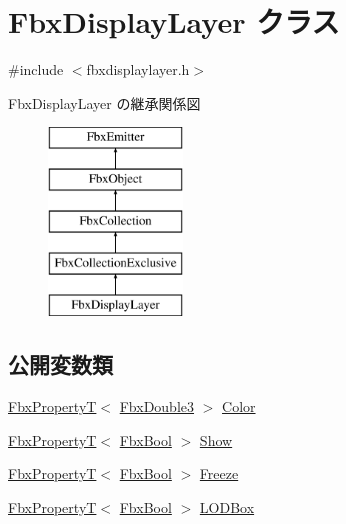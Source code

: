 \hypertarget{class_fbx_display_layer}{}\section{Fbx\+Display\+Layer クラス}
\label{class_fbx_display_layer}


{\ttfamily \#include $<$fbxdisplaylayer.\+h$>$}

Fbx\+Display\+Layer の継承関係図\begin{figure}[H]
\begin{center}
\leavevmode
\includegraphics[height=5.000000cm]{class_fbx_display_layer}
\end{center}
\end{figure}
\subsection*{公開変数類}
\begin{DoxyCompactItemize}
\item 
\hyperlink{class_fbx_property_t}{Fbx\+PropertyT}$<$ \hyperlink{fbxtypes_8h_ae0a96f14cde566774c7553aa7523b7a7}{Fbx\+Double3} $>$ \hyperlink{class_fbx_display_layer_ab43c4c4514ffc390a0ae1d7997a2bf06}{Color}
\item 
\hyperlink{class_fbx_property_t}{Fbx\+PropertyT}$<$ \hyperlink{fbxtypes_8h_a92e0562b2fe33e76a242f498b362262e}{Fbx\+Bool} $>$ \hyperlink{class_fbx_display_layer_a06b26abb009bd57c5472c134c3dff9e1}{Show}
\item 
\hyperlink{class_fbx_property_t}{Fbx\+PropertyT}$<$ \hyperlink{fbxtypes_8h_a92e0562b2fe33e76a242f498b362262e}{Fbx\+Bool} $>$ \hyperlink{class_fbx_display_layer_abbda272dffabbf9c54947efefcce141a}{Freeze}
\item 
\hyperlink{class_fbx_property_t}{Fbx\+PropertyT}$<$ \hyperlink{fbxtypes_8h_a92e0562b2fe33e76a242f498b362262e}{Fbx\+Bool} $>$ \hyperlink{class_fbx_display_layer_ae1e076e8613ebc76150369577dbba985}{L\+O\+D\+Box}
\end{DoxyCompactItemize}
